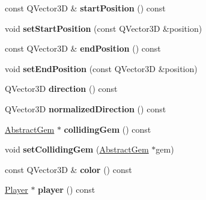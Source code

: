 \begin{DoxyCompactItemize}
\item 
\hypertarget{class_light_ray_a70d3d18bbecdf54dc399df5112ca024a}{}const Q\+Vector3\+D \& {\bfseries start\+Position} () const \label{class_light_ray_a70d3d18bbecdf54dc399df5112ca024a}

\item 
\hypertarget{class_light_ray_a1db98f630b5a18bb297936fc5c8f25fb}{}void {\bfseries set\+Start\+Position} (const Q\+Vector3\+D \&position)\label{class_light_ray_a1db98f630b5a18bb297936fc5c8f25fb}

\item 
\hypertarget{class_light_ray_a13026c9fc18cf7fc2d53832223172f13}{}const Q\+Vector3\+D \& {\bfseries end\+Position} () const \label{class_light_ray_a13026c9fc18cf7fc2d53832223172f13}

\item 
\hypertarget{class_light_ray_a5b9d55f5a6bed4b610f1bc294905dd64}{}void {\bfseries set\+End\+Position} (const Q\+Vector3\+D \&position)\label{class_light_ray_a5b9d55f5a6bed4b610f1bc294905dd64}

\item 
\hypertarget{class_light_ray_acb99bfb7f75989e5ee5a29944e9a9bb7}{}Q\+Vector3\+D {\bfseries direction} () const \label{class_light_ray_acb99bfb7f75989e5ee5a29944e9a9bb7}

\item 
\hypertarget{class_light_ray_a34f82694ce533664616476bca11e7daf}{}Q\+Vector3\+D {\bfseries normalized\+Direction} () const \label{class_light_ray_a34f82694ce533664616476bca11e7daf}

\item 
\hypertarget{class_light_ray_a9db8f3d965dec84c167b6634bee842f4}{}\hyperlink{class_abstract_gem}{Abstract\+Gem} $\ast$ {\bfseries colliding\+Gem} () const \label{class_light_ray_a9db8f3d965dec84c167b6634bee842f4}

\item 
\hypertarget{class_light_ray_a87c45492f6508b5c1adf8300babf8eeb}{}void {\bfseries set\+Colliding\+Gem} (\hyperlink{class_abstract_gem}{Abstract\+Gem} $\ast$gem)\label{class_light_ray_a87c45492f6508b5c1adf8300babf8eeb}

\item 
\hypertarget{class_light_ray_aa8e775f4aacf01e51d2a85ae32cb19cc}{}const Q\+Vector3\+D \& {\bfseries color} () const \label{class_light_ray_aa8e775f4aacf01e51d2a85ae32cb19cc}

\item 
\hypertarget{class_light_ray_ab2e0d1d08c23a451b83907d61af4297a}{}\hyperlink{class_player}{Player} $\ast$ {\bfseries player} () const \label{class_light_ray_ab2e0d1d08c23a451b83907d61af4297a}


\end{DoxyCompactItemize}
